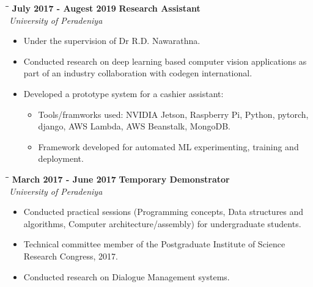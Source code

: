 \documentclass[a4paper,11pt]{article}
\begin{document}
\begin{tabbing}
  \=\hspace*{6cm}\=\hspace*{5cm}\= \kill
  \>\textbf{\large \textbar{}}\textbf{ July 2017 - Augest 2019} \> \textbf{Research Assistant}\\\>\> \emph{University of Peradeniya}
\end{tabbing}
\vspace{-8pt}
\begin{itemize}
  \setlength\itemsep{0pt}
\item Under the supervision of Dr R.D. Nawarathna.
\item Conducted research on deep learning based computer vision applications as part of an industry collaboration with codegen international.
\item Developed a prototype system for a cashier assistant:
  \vspace{-8pt}
  \begin{itemize}
    \setlength\itemsep{0pt}
  \item Tools/framworks used: NVIDIA Jetson, Raspberry Pi, Python, pytorch, django, AWS Lambda, AWS Beanstalk, MongoDB.
  \item Framework developed for automated ML experimenting, training and deployment.
  \end{itemize}
\end{itemize}
\begin{tabbing}
  \=\hspace*{6cm}\=\hspace*{5cm}\= \kill
  \>\textbf{\large \textbar{}}\textbf{ March 2017 - June 2017} \> \textbf{Temporary Demonstrator}\\\>\> \emph{University of Peradeniya}
\end{tabbing}
\vspace{-8pt}
\begin{itemize}
  \setlength\itemsep{0pt}
\item Conducted practical sessions (Programming concepts, Data structures and algorithms, Computer architecture/assembly) for undergraduate students. %
\item Technical committee member of the Postgraduate Institute of Science Research Congress, 2017.
\item Conducted research on Dialogue Management systems.
\end{itemize}
\end{document}
